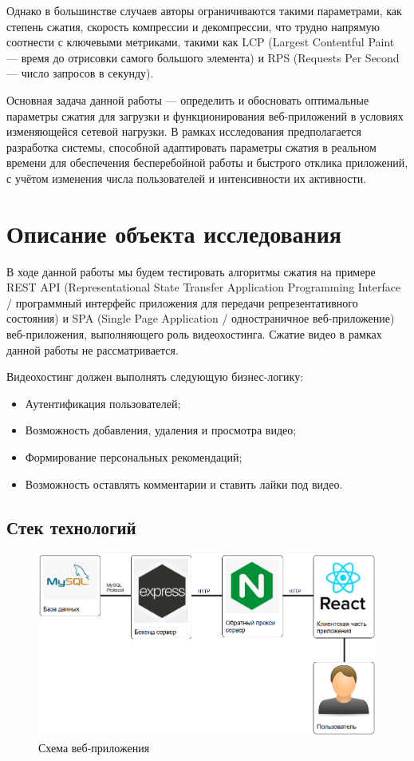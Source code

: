 \documentclass[12pt]{article}
\begin{document}
Однако в большинстве случаев авторы ограничиваются такими параметрами, как степень сжатия, скорость компрессии и декомпрессии,
что трудно напрямую соотнести с ключевыми метриками, такими как LCP (Largest Contentful Paint — время до отрисовки самого большого элемента)
и RPS (Requests Per Second — число запросов в секунду).

Основная задача данной работы — определить и обосновать оптимальные параметры сжатия для загрузки и функционирования
веб-приложений в условиях изменяющейся сетевой нагрузки. В рамках исследования предполагается разработка системы,
способной адаптировать параметры сжатия в реальном времени для обеспечения бесперебойной работы и быстрого отклика приложений,
с учётом изменения числа пользователей и интенсивности их активности.

\section{Описание объекта исследования}

В ходе данной работы мы будем тестировать алгоритмы сжатия на примере REST API  
(Representational State Transfer Application Programming Interface / программный интерфейс приложения для передачи репрезентативного состояния)  
и SPA (Single Page Application / одностраничное веб-приложение) веб-приложения, выполняющего роль видеохостинга.  
Сжатие видео в рамках данной работы не рассматривается.

Видеохостинг должен выполнять следующую бизнес-логику:

\begin{itemize}
    \item Аутентификация пользователей;
    \item Возможность добавления, удаления и просмотра видео;
    \item Формирование персональных рекомендаций;
    \item Возможность оставлять комментарии и ставить лайки под видео.
\end{itemize}

\subsection{Стек технологий}

\begin{figure}[H]
    \centering
    \includegraphics[width=1\textwidth]{../images/Схема_веб-приложения.png}
    \caption{Схема веб-приложения}
\end{figure}
\end{document}
